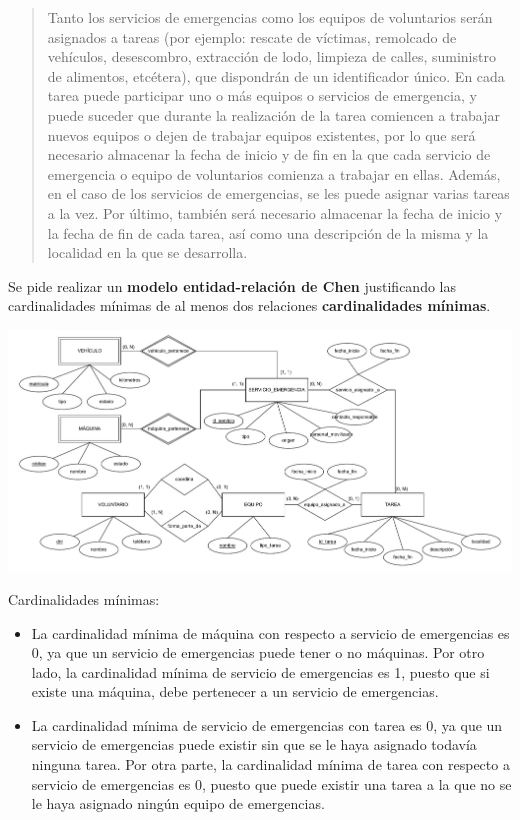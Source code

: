 \documentclass[12pt,a4paper,addpoints,answers]{exam}
\begin{document}
\begin{questions}
\begin{quotation}
Tanto los servicios de emergencias como los equipos de voluntarios serán asignados a tareas (por ejemplo: rescate de víctimas, remolcado de vehículos, desescombro, extracción de lodo, limpieza de calles, suministro de alimentos, etcétera), que dispondrán de un identificador único. En cada tarea puede participar uno o más equipos o servicios de emergencia, y puede suceder que durante la realización de la tarea comiencen a trabajar nuevos equipos o dejen de trabajar equipos existentes, por lo que será necesario almacenar la fecha de inicio y de fin en la que cada servicio de emergencia o equipo de voluntarios comienza a trabajar en ellas. Además, en el caso de los servicios de emergencias, se les puede asignar varias tareas a la vez. Por último, también será necesario almacenar la fecha de inicio y la fecha de fin de cada tarea, así como una descripción de la misma y la localidad en la que se desarrolla.
\end{quotation}

Se pide realizar un \textbf{modelo entidad-relación de Chen} justificando las cardinalidades mínimas de al menos dos relaciones \textbf{cardinalidades mínimas}.

\begin{solution}[50em]
\includegraphics[width=\textwidth]{figs/bbdd-2024-2025-ordinaria/MER.pdf}

Cardinalidades mínimas:
\begin{itemize}
    \item La cardinalidad mínima de máquina con respecto a servicio de emergencias es 0, ya que un servicio de emergencias puede tener o no máquinas. Por otro lado, la cardinalidad mínima de servicio de emergencias es 1, puesto que si existe una máquina, debe pertenecer a un servicio de emergencias.
    \item La cardinalidad mínima de servicio de emergencias con tarea es 0, ya que un servicio de emergencias puede existir sin que se le haya asignado todavía ninguna tarea. Por otra parte, la cardinalidad mínima de tarea con respecto a servicio de emergencias es 0, puesto que puede existir una tarea a la que no se le haya asignado ningún equipo de emergencias.
\end{itemize}
\end{solution}


\end{questions}
\end{document}
